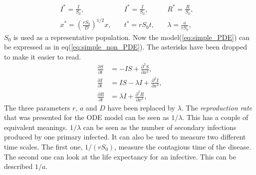 \documentclass[%
twoside,                 %
final,                   %
10pt]{article}
\begin{document}
\begin{equation} \label{eq:constants_nondimensional}
	\begin{aligned}
	I^* =\frac{I}{S_0},&\quad I^* = \frac{I}{S_0},&\quad R^*= \frac{R}{S_0},&\\
	x^* =\left(\frac{rS_0}{D}\right)^{1/2}x,&\quad t^*=rS_0t,&\quad \lambda =\frac{a}{rS_0},&
	\end{aligned}
\end{equation}
$S_0$ is used as a representative population. Now the model(\ref{eq:simple_PDE}) can be expressed as in eq(\ref{eq:simple_non_PDE}). The asterisks have been dropped to make it easier to read.
\begin{equation} \label{eq:simple_non_PDE}
	\begin{aligned}
	\frac{\partial S}{\partial t} &= -IS + \frac{\partial^2 S}{\partial x^2},\\
	\frac{\partial I}{\partial t} &= IS- \lambda I + \frac{\partial^2 I}{\partial x^2},\\
	\frac{\partial R}{\partial t} &= \lambda I + \frac{\partial^2 R}{\partial x^2},
	\end{aligned}
\end{equation}
The three parameters $r$, $a$ and $D$ have been replaced by $\lambda$. The \emph{reproduction rate} that was presented for the ODE model can be seen as $1/\lambda $. This has a couple of equivalent meanings. $1/\lambda$ can be seen as the number of secondary infections produced by one primary infected. It can also be used to measure two different time scales. The first one, $1/(rS_0)$, measure the contagious time of the disease. The second one can look at the life expectancy for an infective. This can be described $1/a$. 
\end{document}
